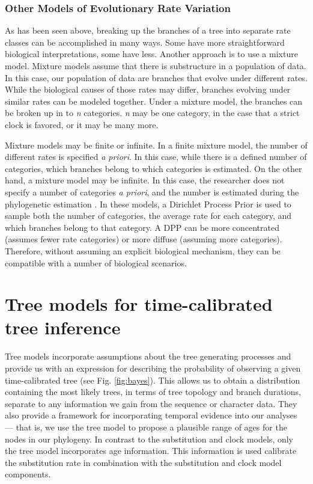 \subsubsection{Other Models of Evolutionary Rate Variation}

As has been seen above, breaking up the branches of a tree into separate rate classes can be accomplished in many ways.
Some have more straightforward biological interpretations, some have less. 
Another approach is to use a mixture model.
Mixture models assume that there is substructure in a population of data.
In this case, our population of data are branches that evolve under different rates.
While the biological causes of those rates may differ, branches evolving under similar rates can be modeled together. 
Under a mixture model, the branches can be broken up in to \textit{n} categories.
\textit{n} may be one category, in the case that a strict clock is favored, or it may be many more.

Mixture models may be finite or infinite.
In a finite mixture model, the number of different rates is specified \textit{a priori}. 
In this case, while there is a defined number of categories, which branches belong to which categories is estimated.
On the other hand, a mixture model may be infinite.
In this case, the researcher does not specify a number of categories \textit{a priori}, and the number is estimated during the phylogenetic estimation \citep{Heath2012a}.
In these models, a Dirichlet Process Prior is used to sample both the number of categories, the average rate for each category, and which branches belong to that category.
A DPP can be more concentrated (assumes fewer rate categories) or more diffuse (assuming more categories).
Therefore, without assuming an explicit biological mechanism, they can be compatible with a number of biological scenarios. 

\section{Tree models for time-calibrated tree inference}


Tree models incorporate assumptions about the tree generating processes and provide us with an expression for describing the probability of observing a given time-calibrated tree (see Fig. \ref{fig:bayes}). This allows us to obtain a distribution containing the most likely trees, in terms of tree topology and branch durations, separate to any information we gain from the sequence or character data.
They also provide a framework for incorporating temporal evidence into our analyses --- that is, we use the tree model to propose a plausible range of ages for the nodes in our phylogeny.
In contrast to the substitution and clock models, only the tree model incorporates age information. %
This information is used calibrate the substitution rate in combination with the substitution and clock model components.

